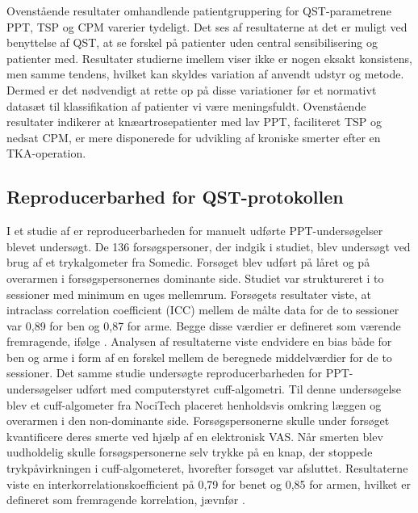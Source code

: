 Ovenstående resultater omhandlende patientgruppering for QST-parametrene PPT, TSP og
CPM varerier tydeligt. Det ses af resultaterne at det er muligt ved benyttelse af QST, at se
forskel på patienter uden central sensibilisering og patienter med. Resultater studierne imellem viser ikke er nogen eksakt konsistens, men samme tendens, hvilket kan skyldes variation af anvendt udstyr og metode. Dermed er det nødvendigt at rette op på disse variationer før et normativt datasæt til klassifikation af patienter vi være meningsfuldt. Ovenstående resultater indikerer at knæartrosepatienter med lav PPT, faciliteret TSP og nedsat CPM, er mere disponerede for udvikling af kroniske smerter efter en TKA-operation.

\subsection{Reproducerbarhed for QST-protokollen}
I et studie af  er reproducerbarheden for manuelt udførte PPT-undersøgelser blevet undersøgt. De 136 forsøgspersoner, der indgik i studiet, blev undersøgt ved brug af et trykalgometer fra Somedic. Forsøget blev udført på låret og på overarmen i forsøgspersonernes dominante side. Studiet var struktureret i to sessioner med minimum en uges mellemrum. Forsøgets resultater viste, at intraclass correlation coefficient (ICC) mellem de målte data for de to sessioner var 0,89 for ben og 0,87 for arme. Begge disse værdier er defineret som værende fremragende, ifølge . Analysen af resultaterne viste endvidere en bias både for ben og arme i form af en forskel mellem de beregnede middelværdier for de to sessioner. Det samme studie undersøgte reproducerbarheden for PPT-undersøgelser udført med computerstyret cuff-algometri. Til denne undersøgelse blev et cuff-algometer fra NociTech placeret henholdsvis omkring læggen og overarmen i den non-dominante side. Forsøgspersonerne skulle under forsøget kvantificere deres smerte ved hjælp af en elektronisk VAS. Når smerten blev uudholdelig skulle forsøgspersonerne selv trykke på en knap, der stoppede trykpåvirkningen i cuff-algometeret, hvorefter forsøget var afsluttet. Resultaterne viste en interkorrelationskoefficient på 0,79 for benet og 0,85 for armen, hvilket er defineret som fremragende korrelation, jævnfør . \citep{Nielsen2015}

